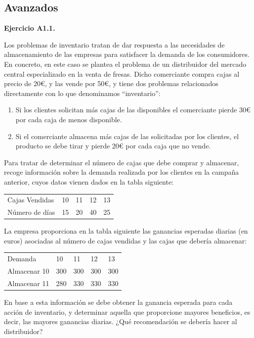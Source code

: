 \documentclass[
]{book}
\providecommand{\tightlist}{%
  \setlength{\itemsep}{0pt}\setlength{\parskip}{0pt}}
\theoremstyle{definition}
\theoremstyle{definition}
\theoremstyle{definition}
\theoremstyle{definition}
\theoremstyle{remark}
\begin{document}
\hypertarget{avanzados}{%
\subsection{Avanzados}\label{avanzados}}

\textbf{Ejercicio A1.1.}

Los problemas de inventario tratan de dar respuesta a las necesidades de almacenamiento de las empresas para satisfacer la demanda de los consumidores. En concreto, en este caso se plantea el problema de un distribuidor del mercado central especializado en la venta de fresas. Dicho comerciante compra cajas al precio de 20€, y las vende por 50€, y tiene dos problemas relacionados directamente con lo que denominamos ``inventario'':

\begin{enumerate}
\def\labelenumi{\alph{enumi})}
\tightlist
\item
  Si los clientes solicitan más cajas de las disponibles el comerciante pierde 30€ por cada caja de menos disponible.
\item
  Si el comerciante almacena más cajas de las solicitadas por los clientes, el producto se debe tirar y pierde 20€ por cada caja que no vende.
\end{enumerate}

Para tratar de determinar el número de cajas que debe comprar y almacenar, recoge información sobre la demanda realizada por los clientes en la campaña anterior, cuyos datos vienen dados en la tabla siguiente:

\begin{longtable}[]{@{}lllll@{}}
\toprule
\endhead
Cajas Vendidas & 10 & 11 & 12 & 13 \\
Número de días & 15 & 20 & 40 & 25 \\
\bottomrule
\end{longtable}

La empresa proporciona en la tabla siguiente las ganancias esperadas diarias (en euros) asociadas al número de cajas vendidas y las cajas que debería almacenar:

\begin{longtable}[]{@{}lllll@{}}
\toprule
\endhead
Demanda & 10 & 11 & 12 & 13 \\
Almacenar 10 & 300 & 300 & 300 & 300 \\
Almacenar 11 & 280 & 330 & 330 & 330 \\
\bottomrule
\end{longtable}

En base a esta información se debe obtener la ganancia esperada para cada acción de inventario, y determinar aquella que proporcione mayores beneficios, es decir, las mayores ganancias diarias. ¿Qué recomendación se debería hacer al distribuidor?
\end{document}

